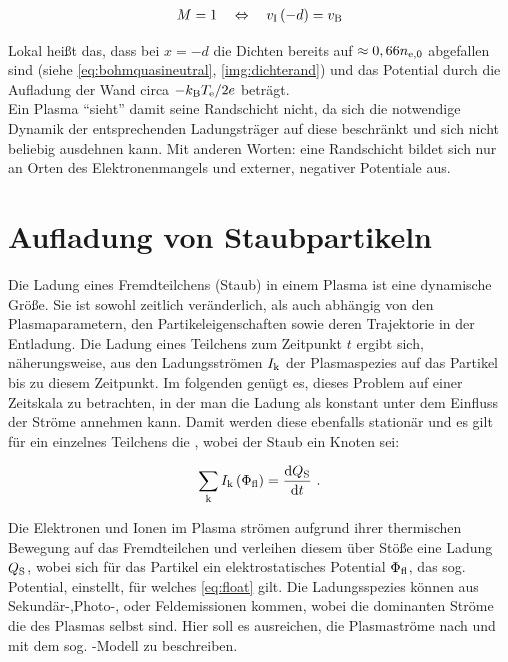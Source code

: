       \begin{align}
        M=1 \quad \Leftrightarrow \quad v_\text{I}\left(-d\right)=v_\text{B} \label{eq:bohmkritzwei}
      \end{align}

    Lokal heißt das, dass bei $x=-d$ die Dichten bereits auf $\approx0,66n_\text{e,0}$ abgefallen sind (siehe \ref{eq:bohmquasineutral}, \autoref{img:dichterand}) und das Potential durch die Aufladung der Wand circa $-k_\text{B}T_\text{e}/2e$ beträgt.\\
    Ein Plasma "`sieht"' damit seine Randschicht nicht, da sich die notwendige Dynamik der entsprechenden Ladungsträger auf diese beschränkt und sich nicht beliebig ausdehnen kann. Mit anderen Worten: eine Randschicht bildet sich nur an Orten des Elektronenmangels und externer, negativer Potentiale aus.

  \section{Aufladung von Staubpartikeln}\label{sub:ströme}

    Die Ladung eines Fremdteilchens (Staub) in einem Plasma ist eine dynamische Größe. Sie ist sowohl zeitlich veränderlich, als auch abhängig von den Plasmaparametern, den Partikeleigenschaften sowie deren Trajektorie in der Entladung. Die Ladung eines Teilchens zum Zeitpunkt $t$ ergibt sich, näherungsweise, aus den Ladungsströmen $I_\text{k}$ der Plasmaspezies auf das Partikel bis zu diesem Zeitpunkt. Im folgenden genügt es, dieses Problem auf einer Zeitskala zu betrachten, in der man die Ladung als konstant unter dem Einfluss der Ströme annehmen kann. Damit werden diese ebenfalls stationär und es gilt für ein einzelnes Teilchens die , wobei der Staub ein Knoten sei:

      \begin{align}
        \sum_{\text{k}} I_\text{k}\left(\Phi_\text{fl}\right)=\frac{\textnormal{d} Q_\text{S}}{\textnormal{d} t} \,\, . \label{eq:float}
      \end{align}

  Die Elektronen und Ionen im Plasma strömen aufgrund ihrer thermischen Bewegung auf das Fremdteilchen und verleihen diesem über Stöße eine Ladung $Q_\text{S}$, wobei sich für das Partikel ein elektrostatisches Potential $\Phi_\text{fl}$, das sog.  Potential, einstellt, für welches \autoref{eq:float} gilt. Die Ladungsspezies können aus Sekundär-,Photo-, oder Feldemissionen kommen, wobei die dominanten Ströme die des Plasmas selbst sind. Hier soll es ausreichen, die Plasmaströme nach   und  mit dem sog. -Modell \cite{Langmuir26} zu beschreiben. 

